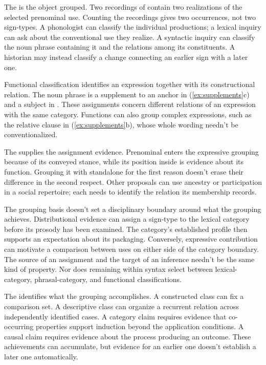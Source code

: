 \documentclass[12pt]{article}
\begin{document}
The  is the object grouped. Two recordings of  contain two realizations of the selected prenominal
 use. Counting the recordings gives two occurrences, not
two sign-types. A phonologist can classify the individual productions;
a lexical inquiry can ask about the conventional use they realize.
A syntactic inquiry can classify the noun phrase containing it and
the relations among its constituents. A historian may instead classify
a change connecting an earlier sign with a later one.

Functional classification identifies an expression together with its
constructional relation. The noun phrase  is a
supplement to an anchor in (\ref{ex:supplements}c) and a subject in
. These assignments
concern different relations of an expression with the same category.
Functions can also group complex expressions, such as the relative
clause in (\ref{ex:supplements}b), whose whole wording needn't be conventionalized.

The  supplies the assignment evidence. Prenominal
 enters the expressive grouping because of its conveyed
stance, while its position inside  is evidence
about its function. Grouping it with standalone  for
the first reason doesn't erase their difference in the second respect.
Other proposals can use ancestry or participation in a social repertoire;
each needs to identify the relation its membership records.

The grouping basis doesn't set a disciplinary boundary around what the
grouping achieves. Distributional evidence can assign a sign-type to the
lexical category before its prosody has been examined.
The category's established profile then supports an expectation about
its packaging. Conversely, expressive contribution can motivate a
comparison between  uses on either side of the category
boundary. The source of an assignment and the target of an inference
needn't be the same kind of property. Nor does
remaining within syntax select between lexical-category, phrasal-category,
and functional classifications.

The  identifies what the grouping accomplishes. A
constructed class can fix a comparison set. A descriptive class can
organize a recurrent relation across independently identified cases.
A category claim requires evidence that co-occurring properties support
induction beyond the application conditions. A causal claim requires
evidence about the process producing an outcome. These achievements
can accumulate, but evidence for an earlier one doesn't establish a
later one automatically.
\end{document}
